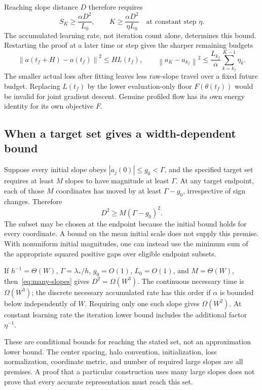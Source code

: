 \documentclass[11pt]{article}
\theoremstyle{remark}
\newcommand{\norm}[1]{\left\lVert #1\right\rVert}
\begin{document}
Reaching slope distance $D$ therefore requires
\begin{equation}
 S_K\geq\frac{\alpha D^2}{L_0},\qquad
 K\geq\frac{\alpha D^2}{\eta L_0}
 \quad\text{at constant step }\eta.
 \label{eq:effective-time}
\end{equation}
The accumulated learning rate, not iteration count alone, determines this bound. Restarting the proof at a later time or step gives the sharper remaining budgets
\begin{equation}
 \norm{a(t_f+H)-a(t_f)}^2\leq H L(t_f),\qquad
 \norm{a_K-a_{k_f}}^2\leq
 \frac{L_{k_f}}{\alpha}\sum_{k=k_f}^{K-1}\eta_k.
 \label{eq:late-budget}
\end{equation}
The smaller actual loss after fitting leaves less raw-slope travel over a fixed future budget. Replacing $L(t_f)$ by the lower evaluation-only floor $F(\theta(t_f))$ would be invalid for joint gradient descent. Genuine profiled flow has its own energy identity for its own objective $F$.

\subsection{When a target set gives a width-dependent bound}

Suppose every initial slope obeys $|a_j(0)|\leq g_0<\Gamma$, and the specified target set requires at least $M$ slopes to have magnitude at least $\Gamma$. At any target endpoint, each of those $M$ coordinates has moved by at least $\Gamma-g_0$, irrespective of sign changes. Therefore
\begin{equation}
 D^2\geq M(\Gamma-g_0)^2.
 \label{eq:many-slopes}
\end{equation}
The subset may be chosen at the endpoint because the initial bound holds for every coordinate. A bound on the mean initial scale does not supply this premise. With nonuniform initial magnitudes, one can instead use the minimum sum of the appropriate squared positive gaps over eligible endpoint subsets.

If $h^{-1}=\Theta(W)$, $\Gamma=\lambda_*/h$, $g_0=O(1)$, $L_0=O(1)$, and $M=\Theta(W)$, then~\eqref{eq:many-slopes} gives $D^2=\Omega(W^3)$. The continuous necessary time is $\Omega(W^3)$; the discrete necessary accumulated rate has this order if $\alpha$ is bounded below independently of $W$. Requiring only one such slope gives $\Omega(W^2)$. At constant learning rate the iteration lower bound includes the additional factor $\eta^{-1}$.

These are conditional bounds for reaching the stated set, not an approximation lower bound. The center spacing, halo convention, initialization, loss normalization, coordinate metric, and number of required large slopes are all premises. A proof that a particular construction uses many large slopes does not prove that every accurate representation must reach this set.
\end{document}

